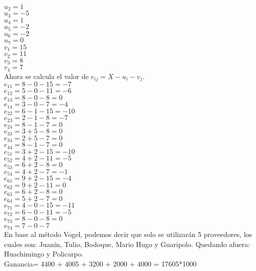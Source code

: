\documentclass[12pt,letterpaper]{article}
\begin{document}
$u_{2}=1$ \\
$u_{3}=-5$ \\
$u_{4}=1$ \\
$u_{5}=-2$ \\
$u_{6}=-2$ \\
$u_{7}=0$ \\
$v_{1}=15$ \\
$v_{2}=11$ \\
$v_{3}=8$ \\
$v_{4}=7$ \\

Ahora se calcula el valor de $e_{ij}=X-u_{i}-v_{j}$. \\

$e_{11}=8-0-15=-7$ \\
$e_{12}=5-0-11=-6$ \\
$e_{13}=8-0-8= 0$\\
$e_{14}=3-0-7=-4$ \\
$e_{22}=6-1-15=-10$ \\
$e_{23}=2-1-8=-7$ \\
$e_{24}=8-1-7=0$ \\
$e_{33}=3+5-8=0$ \\
$e_{34}=2+5-7=0$ \\
$e_{44}=8-1-7=0$ \\
$e_{51}=3+2-15=-10$ \\
$e_{52}=4+2-11=-5$ \\
$e_{53}=6+2-8=0$ \\
$e_{54}=4+2-7=-1$ \\
$e_{61}=9+2-15=-4$ \\
$e_{62}=9+2-11=0$ \\
$e_{63}=6+2-8=0$ \\
$e_{64}=5+2-7=0$ \\
$e_{71}=4-0-15=-11$ \\
$e_{72}=6-0-11=-5$ \\
$e_{73}=8-0-8=0$ \\
$e_{74}=7-0-7$ \\

En base al método Vogel, podemos decir que solo se utilizarán 5 proveedores, los cuales son: Juanín, Tulio, Bodoque, Mario Hugo y Guaripolo. Quedando afuera: Huachimingo y Policarpo.\\
Ganancia= 4400 + 4005 + 3200 + 2000 + 4000 = 17605*1000
\end{document}
